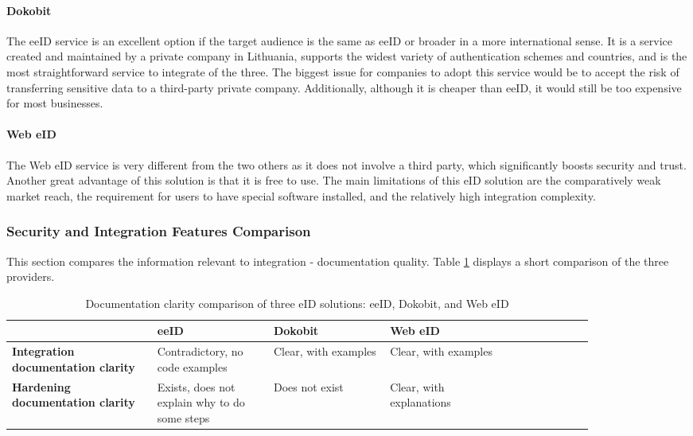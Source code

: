 \paragraph{Dokobit}

The eeID service is an excellent option if the target audience is the same as eeID or broader in a more international sense. It is a service created and maintained by a private company in Lithuania, supports the widest variety of authentication schemes and countries, and is the most straightforward service to integrate of the three. The biggest issue for companies to adopt this service would be to accept the risk of transferring sensitive data to a third-party private company. Additionally, although it is cheaper than eeID, it would still be too expensive for most businesses.

\paragraph{Web eID}

The Web eID service is very different from the two others as it does not involve a third party, which significantly boosts security and trust. Another great advantage of this solution is that it is free to use. The main limitations of this eID solution are the comparatively weak market reach, the requirement for users to have special software installed, and the relatively high integration complexity.

\subsubsection{Security and Integration Features Comparison}

This section compares the information relevant to integration - documentation quality. Table \ref{tbl:summary-comparison-docs} displays a short comparison of the three providers.

\begin{table}
    \centering
    \begin{tabular}{ >{\raggedright}p{0.25\linewidth} | >{\raggedright}p{0.2\linewidth} | >{\raggedright}p{0.2\linewidth} | >{\raggedright}p{0.2\linewidth} p{0px}}
                                                   & \textbf{eeID}                                 & \textbf{Dokobit}     & \textbf{Web eID}         & \\
        \hline
        \textbf{Integration documentation clarity} & Contradictory, no code examples               & Clear, with examples & Clear, with examples     & \\
        \hline
        \textbf{Hardening documentation clarity}   & Exists, does not explain why to do some steps & Does not exist       & Clear, with explanations & \\
    \end{tabular}
    \caption{Documentation clarity comparison of three eID solutions: eeID, Dokobit, and Web eID}
    \label{tbl:summary-comparison-docs}
\end{table}


